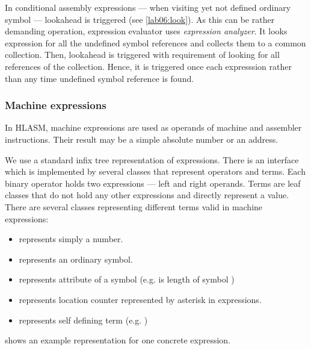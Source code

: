 In conditional assembly expressions --- when visiting yet not defined ordinary symbol --- lookahead is triggered (see \cref{lab06:look}). As this can be rather demanding operation, expression evaluator uses \emph{expression analyzer}. It looks expression for all the undefined symbol references and collects them to a common collection. Then, lookahead is triggered with requirement of looking for all references of the collection. Hence, it is triggered once each expresssion rather than any time undefined symbol reference is found. 

\subsubsection{Machine expressions}

In HLASM, machine expressions are used as operands of machine and assembler instructions. Their result may be a simple absolute number or an address.

We use a standard infix tree representation of expressions. There is an interface  which is implemented by several classes that represent operators and terms. Each binary operator holds two expressions --- left and right operands. Terms are leaf classes that do not hold any other expressions and directly represent a value. There are several classes representing different terms valid in machine expressions:
\begin{itemize}
	\item {} represents simply a number.
	\item {} represents an ordinary symbol.
	\item {} represents attribute of a symbol (e.g.  is length of symbol )
	\item {} represents location counter represented by asterisk in expressions. 
	\item {} represents self defining term (e.g. )
\end{itemize}
 shows an example representation for one concrete expression.

